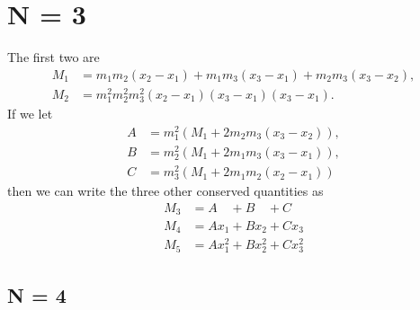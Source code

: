 \documentclass[english,master]{liumaiex}
\theoremstyle{plain}
\theoremstyle{definition}
\begin{document}
\section{N = 3}

The first two are
\begin{align}
	M_1 &= m_1m_2(x_2 - x_1) + m_1m_3(x_3 - x_1) + m_2m_3(x_3 - x_2), \\
	M_2 &= m_1^2m_2^2m_3^2(x_2 - x_1)(x_3 - x_1)(x_3 - x_1).
\end{align}
If we let
\begin{align}
	A & = m_1^2(M_1 + 2m_2m_3(x_3-x_2)), \\
	B & = m_2^2(M_1 + 2m_1m_3(x_3-x_1)), \\
	C & = m_3^2(M_1 + 2m_1m_2(x_2-x_1))
\end{align}
then we can write the three other conserved quantities as
\begin{align}
	M_3 &= A\phantom{x_1} + B\phantom{x_2} + C\phantom{x_3} \\
	M_4 &= Ax_1 + Bx_2 + Cx_3 \\
	M_5 &= Ax_1^2 + Bx_2^2 + Cx_3^2
\end{align}

\subsection{N = 4}
\end{document}

